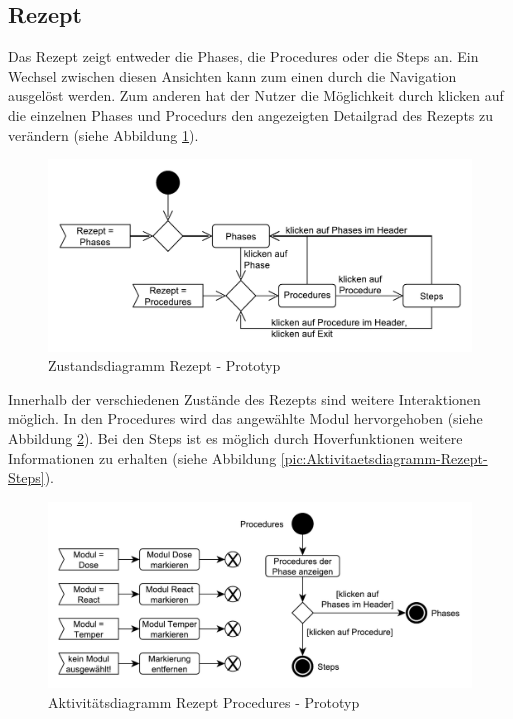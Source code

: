 \subsection{Rezept}
Das Rezept zeigt entweder die Phases, die Procedures oder die Steps an. Ein Wechsel zwischen diesen Ansichten kann zum einen durch die Navigation ausgelöst werden. Zum anderen hat der Nutzer die Möglichkeit durch klicken auf die einzelnen Phases und Procedurs den angezeigten Detailgrad des Rezepts zu verändern (siehe Abbildung \ref{pic:Zustandsdiagramm-Rezept}).
\begin{figure}[htbp]
\centering
\includegraphics[scale=0.6]{DA_files/UML/Prototyp/Zustandsdiagramm-Rezept.pdf}
\caption{Zustandsdiagramm Rezept - Prototyp}
\label{pic:Zustandsdiagramm-Rezept}
\end{figure}
Innerhalb der verschiedenen Zustände des Rezepts sind weitere Interaktionen möglich. In den Procedures wird das angewählte Modul hervorgehoben (siehe Abbildung \ref{pic:Aktivitaetsdiagramm-Rezept-Procedures}). Bei den Steps ist es möglich durch Hoverfunktionen weitere Informationen zu erhalten (siehe Abbildung \ref{pic:Aktivitaetsdiagramm-Rezept-Steps}).
\begin{figure}[htbp]
\centering
\includegraphics[scale=0.6]{DA_files/UML/Prototyp/Aktivitaetsdiagramm-Rezept-Procedures.pdf}
\caption{Aktivitätsdiagramm Rezept Procedures - Prototyp}
\label{pic:Aktivitaetsdiagramm-Rezept-Procedures}
\end{figure}

